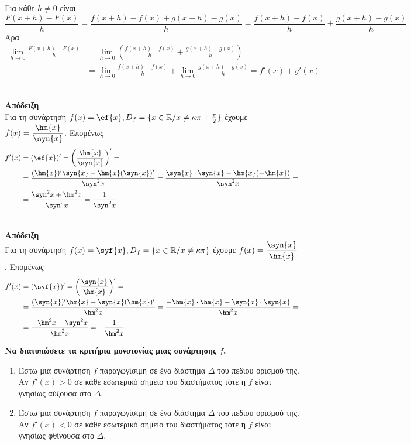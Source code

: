 \documentclass[11pt,a4paper]{article}
\newcommand{\kerkissans}[1]{{\fontfamily{maksf}\selectfont \textbf{#1}}}
\begin{document}
\begin{theory}[resume]
Για κάθε $h\neq 0$ είναι
\[ \frac{F(x+h)-F(x)}{h}=\frac{f(x+h)-f(x)+g(x+h)-g(x)}{h}=\frac{f(x+h)-f(x)}{h}+\frac{g(x+h)-g(x)}{h} \]
Άρα
\begin{align*}
\lim_{h\to 0}{\frac{F(x+h)-F(x)}{h}}&=\lim_{h\to 0}{\left(\frac{f(x+h)-f(x)}{h}+\frac{g(x+h)-g(x)}{h}\right)}=\\&=\lim_{h\to 0}{\frac{f(x+h)-f(x)}{h}}+\lim_{h\to 0}{\frac{g(x+h)-g(x)}{h}}=f'(x)+g'(x)
\end{align*}
\item {}\\
\textbf{\kerkissans{Απόδειξη}}\\
Για τη συνάρτηση $f(x)=\ef{x},D_f=\{x\in\mathbb{R}/x\neq \kappa\pi+\frac{\pi}{2}\}$ έχουμε $f(x)=\dfrac{\hm{x}}{\syn{x}}$. Επομένως
\begin{align*}
f'(x)&=(\ef{x})'=\left(\frac{\hm{x}}{\syn{x}}\right)'=\\&=\frac{(\hm{x})'\syn{x}-\hm{x}(\syn{x})'}{\syn^2{x}}=\frac{\syn{x}\cdot\syn{x}-\hm{x}(-\hm{x})}{\syn^2{x}}=\\
&=\frac{\syn^2{x}+\hm^2{x}}{\syn^2{x}}=\frac{1}{\syn^2{x}} 
\end{align*}
\item {}\\
\textbf{\kerkissans{Απόδειξη}}\\
Για τη συνάρτηση $f(x)=\syf{x},D_f=\{x\in\mathbb{R}/x\neq \kappa\pi\}$ έχουμε $f(x)=\dfrac{\syn{x}}{\hm{x}}$. Επομένως
\begin{align*}
f'(x)&=(\syf{x})'=\left(\frac{\syn{x}}{\hm{x}}\right)'=\\&=\frac{(\syn{x})'\hm{x}-\syn{x}(\hm{x})'}{\hm^2{x}}=\frac{-\hm{x}\cdot\hm{x}-\syn{x}\cdot\syn{x}}{\hm^2{x}}=\\
&=\frac{-\hm^2{x}-\syn^2{x}}{\hm^2{x}}=-\frac{1}{\hm^2{x}} 
\end{align*}
\item \textbf{Να διατυπώσετε τα κριτήρια μονοτονίας μιας συνάρτησης $f$.}
\begin{enumerate}
\item Έστω μια συνάρτηση $f$ παραγωγίσιμη σε ένα διάστημα $\Delta$ του πεδίου ορισμού της. Αν $f'(x)>0$ σε κάθε εσωτερικό σημείο του διαστήματος τότε η $f$ είναι γνησίως αύξουσα στο $\Delta$.
\item Έστω μια συνάρτηση $f$ παραγωγίσιμη σε ένα διάστημα $\Delta$ του πεδίου ορισμού της. Αν $f'(x)<0$ σε κάθε εσωτερικό σημείο του διαστήματος τότε η $f$ είναι γνησίως φθίνουσα στο $\Delta$.

\end{enumerate}
\end{theory}
\end{document}
